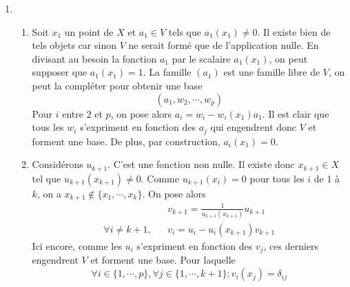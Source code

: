 \begin{enumerate}
\item 
\begin{enumerate}
\item Soit $x_{1}$ un point de $X$ et $a_1\in V$ tels que $a_1(x_{1})\neq 0$. Il existe bien de tels objets car sinon $V$ ne serait formé que de l'application nulle. En divisant au besoin la fonction $a_1$ par le scalaire $a_1(x_{1})$, on peut supposer que $ a_1(x_{1})=1$. La famille $(a_1)$ est une famille libre de $V$, on peut la compléter pour obtenir une base
\[(a_1,w_{2},\cdots,w_{p})\]
Pour $i$ entre $2$ et $p$, on pose alors $a_i=w_{i}-w_{i}(x_{1})a_1$. Il est clair que tous les $w_{i}$ s'expriment en fonction des $a_j$ qui engendrent donc $V$ et forment une base. De plus, par construction, $a_i(x_{1})=0$.
\item Considérons $u_{k+1}$. C'est une fonction non nulle. Il existe donc $x_{k+1}\in X$ tel que $u_{k+1}(x_{k+1})\neq 0$. Comme $u_{k+1}(x_{i}) = 0$ pour tous les $i$ de 1 à $k$, on a $x_{k+1}\not \in \{x_{1},\cdots,x_{k}\}$. On pose alors 
\begin{align*}
 & &v_{k+1} = \frac{1}{u_{k+1}(x_{k+1})}u_{k+1}\\
\forall i\neq k+1 ,& &v_{i} = u_{i}-u_{i}(x_{k+1})v_{k+1}
\end{align*}
Ici encore, comme les $u_{i}$ s'expriment en fonction des $v_{j}$, ces derniers engendrent $V$ et forment une base. Pour laquelle
\begin{displaymath}
 \forall i \in \{1,\cdots,p\} , \forall j \in \{1,\cdots,k+1\} : v_i(x_j)=\delta_{ij}
\end{displaymath}


\end{enumerate}
\end{enumerate}
